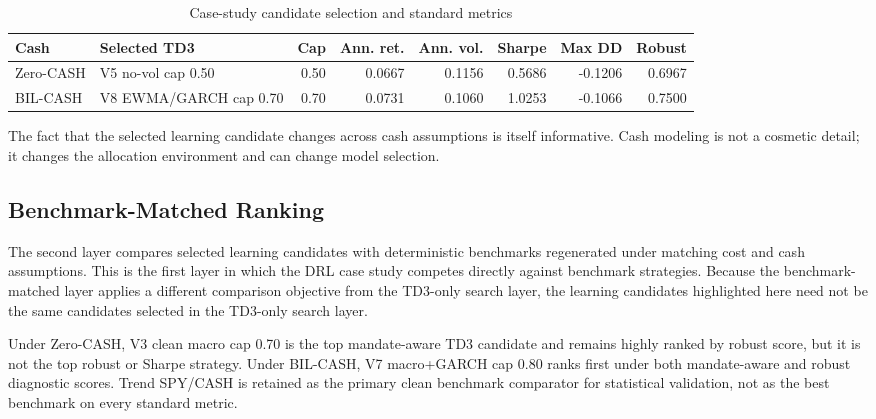 \documentclass[12pt]{article}
\begin{document}
\begin{table}[htbp]
\centering
\caption{Case-study candidate selection and standard metrics}
\scriptsize
\begin{tabularx}{\textwidth}{L{0.14\textwidth}Yrrrrrr}
\toprule
\textbf{Cash} & \textbf{Selected TD3} & \textbf{Cap} & \textbf{Ann. ret.} & \textbf{Ann. vol.} & \textbf{Sharpe} & \textbf{Max DD} & \textbf{Robust} \\
\midrule
Zero-CASH & V5 no-vol cap 0.50 & 0.50 & 0.0667 & 0.1156 & 0.5686 & -0.1206 & 0.6967 \\
BIL-CASH & V8 \mbox{EWMA/GARCH} cap 0.70 & 0.70 & 0.0731 & 0.1060 & 1.0253 & -0.1066 & 0.7500 \\
\bottomrule
\end{tabularx}
\end{table}

The fact that the selected learning candidate changes across cash assumptions is itself informative. Cash modeling is not a cosmetic detail; it changes the allocation environment and can change model selection.

\subsection{Benchmark-Matched Ranking}

The second layer compares selected learning candidates with deterministic benchmarks regenerated under matching cost and cash assumptions. This is the first layer in which the DRL case study competes directly against benchmark strategies. Because the benchmark-matched layer applies a different comparison objective from the TD3-only search layer, the learning candidates highlighted here need not be the same candidates selected in the TD3-only search layer.

Under Zero-CASH, V3 clean macro cap 0.70 is the top mandate-aware TD3 candidate and remains highly ranked by robust score, but it is not the top robust or Sharpe strategy. Under BIL-CASH, V7 macro+GARCH cap 0.80 ranks first under both mandate-aware and robust diagnostic scores. Trend SPY/CASH is retained as the primary clean benchmark comparator for statistical validation, not as the best benchmark on every standard metric.
\end{document}
